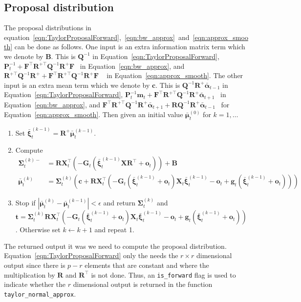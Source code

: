 \documentclass[9pt, notitlepage]{article}
\renewcommand{\vec}[1]{\bm{#1}}
\newcommand{\vecb}[1]{\bar{\vec{#1}}}
\newcommand{\mat}[1]{\mathbf{#1}}
\newcommand{\Lparen}[1]{\left( #1\right)}
\newcommand{\Lvert}[1]{\left\vert #1\right\vert}
\newcommand{\dimState}{p}
\newcommand{\dimRng}{r}
\begin{document}
\subsection{Proposal distribution}
The proposal distributions in equation~\eqref{eqn:TaylorProposalForward},~\eqref{eqn:bw_approx}~and~\eqref{eqn:approx_smooth} can be done as follows. One input is an extra information matrix term which we denote by $\mat{B}$. This is $\mat{Q}^{-1}$ in Equation~\eqref{eqn:TaylorProposalForward}, %
$\mat{P}_t^{-1} + \mat{F}^\top\mat{R}^{+\top}\mat{Q}^{-1}\mat{R}^+\mat{F}$%
~in Equation~\eqref{eqn:bw_approx}, and \\%
$\mat{R}^{+\top}\mat{Q}^{-1}\mat{R}^+ + \mat{F}^\top\mat{R}^{+\top}\mat{Q}^{-1}\mat{R}^+\mat{F}$%
~ in Equation~\eqref{eqn:approx_smooth}. The other input is an extra mean term which we denote by $\vec{c}$. This is $\mat{Q}^{-1}\mat{R}^+\vecb{\alpha}_{t-1}$ in Equation~\eqref{eqn:TaylorProposalForward}, %
$\mat{P}_t^{-1}\vec{m}_t + \mat{F}^\top\mat{R}^{+\top}\mat{Q}^{-1}\mat{R}^+\vecb{\alpha}_{t+1}$%
~in Equation~\eqref{eqn:bw_approx}, and %
$\mat{F}^\top\mat{R}^{+\top}\mat{Q}^{-1}\mat{R}^+\vecb{\alpha}_{t+1} + 
	\mat{R}\mat{Q}^{-1}\mat{R}^+\vecb{\alpha}_{t-1}$~ for Equation~\eqref{eqn:approx_smooth}. Then given an initial value $\vecb{\mu}_t^{(0)}$ for $k = 1, \dots$%
%
\begin{enumerate}
  \item Set $\vecb{\xi}_t^{(k - 1)} = \mat{R}^+ \vecb{\mu}_t^{(k - 1)}$. 
  \item Compute %
  {\scriptsize \begin{align*}
  		\mat{\Sigma}_t^{(k)-} &= 
  		\mat{R}\mat{X}_t^\top\Lparen{-\mat{G}_t\Lparen{
  			\vecb{\xi}_t^{(k-1)}\mat{X}\mat{R}^\top + \vec{o}_t}
  		} + \mat{B}  \\
%
	\vecb{\mu}_t^{(k)}
	&= \mat{\Sigma}_t^{(k)}\Lparen{
		\vec{c} +
		\mat{R}\mat{X}_t^\top
		\Lparen{
			-\mat{G}_t\Lparen{\vecb{\xi}_t^{(k -1)} + \vec{o}_t}
			\mat{X}_t\vecb{\xi}_t^{(k - 1)} - \vec{o}_t +
			\vec{g}_t\Lparen{\vecb{\xi}_t^{(k -1)} + \vec{o}_t}
		}
	}
  \end{align*}
  }
  \item Stop if $\Lvert{\vecb{\mu}_t^{(k)} - \vecb{\mu}_t^{(k - 1)}} < \epsilon$ and return $\mat{\Sigma}_t^{(k)}$ and \\%
$\vec{t} = \mat{\Sigma}_t^{(k)}\mat{R}\mat{X}_t^\top
		\Lparen{
			-\mat{G}_t\Lparen{\vecb{\xi}_t^{(k -1)} + \vec{o}_t}
			\mat{X}_t\vecb{\xi}_t^{(k -1)} - \vec{o}_t +
			\vec{g}_t\Lparen{\vecb{\xi}_t^{(k -1)} + \vec{o}_t}
		}$%
. Otherwise set $k \leftarrow k + 1$ and repeat 1. 
\end{enumerate}

The returned output it was we need to compute the proposal distribution. Equation~\eqref{eqn:TaylorProposalForward} only the needs the $\dimRng\times\dimRng$ dimensional output since there is $\dimState - \dimRng$ elements that are constant and where the multiplication by $\mat{R}$ and $\mat{R}^\top$ is not done. Thus, an \texttt{is\_forward} flag is used to indicate whether the $\dimRng$ dimensional output is returned in the function \texttt{taylor\_normal\_approx}.





\newpage


\end{document}
